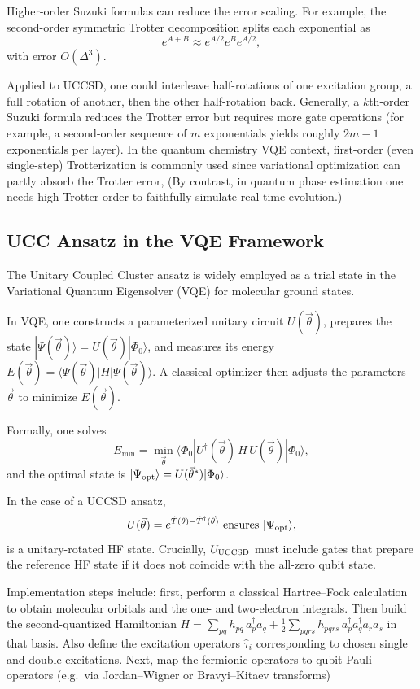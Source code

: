 \documentclass[twocolumn,superscriptaddress,unsortedaddress,nofootinbib,amsmath,amssymb,
aps,floatfix]{revtex4-2}
\begin{document}
Higher-order Suzuki formulas can reduce the error scaling.  For
example, the second-order symmetric Trotter decomposition splits each
exponential as
\begin{equation}
e^{A+B} \approx e^{A/2} e^{B} e^{A/2},
\end{equation}
with error $O(\Delta^3)$.

Applied to UCCSD, one could interleave half-rotations of one
excitation group, a full rotation of another, then the other
half-rotation back.  Generally, a $k$th-order Suzuki formula reduces
the Trotter error but requires more gate operations (for example, a
second-order sequence of $m$ exponentials yields roughly $2m-1$
exponentials per layer).  In the quantum chemistry VQE context,
first-order (even single-step) Trotterization is commonly used since
variational optimization can partly absorb the Trotter error,
(By contrast, in quantum phase estimation one needs high Trotter order to faithfully simulate real time-evolution.) 

\subsection{UCC Ansatz in the VQE Framework}

The Unitary Coupled Cluster ansatz is widely employed as a trial state
in the Variational Quantum Eigensolver (VQE) for molecular ground
states.

In VQE, one constructs a parameterized unitary circuit
$U(\vec\theta)$, prepares the state $|\Psi(\vec\theta)\rangle =
U(\vec\theta)|\Phi_0\rangle$, and measures its energy
$E(\vec\theta)=\langle\Psi(\vec\theta)|H|\Psi(\vec\theta)\rangle$.  A
classical optimizer then adjusts the parameters $\vec\theta$ to
minimize $E(\vec\theta)$.

Formally, one solves 
\[
E_{\min} = \min_{\vec\theta}\langle\Phi_0|U^\dagger(\vec\theta)\,H\,U(\vec\theta)|\Phi_0\rangle,
\]
and the optimal state is $|\Psi_{\rm opt}\rangle = U(\vec\theta^*)|\Phi_0\rangle$.

In the case of a UCCSD ansatz,
\[
U(\vec\theta)=e^{\hat T(\vec\theta)-\hat T^\dagger(\vec\theta)}$ ensures $|\Psi_{\rm opt}\rangle,
\]
is a unitary-rotated HF state.  Crucially, $U_{\rm UCCSD}$ must
include gates that prepare the reference HF state if it does not
coincide with the all-zero qubit state.

Implementation steps include: first, perform a classical Hartree--Fock
calculation to obtain molecular orbitals and the one- and two-electron
integrals.  Then build the second-quantized Hamiltonian
$H=\sum_{pq}h_{pq}\,a_p^\dagger a_q +
\frac12\sum_{pqrs}h_{pqrs}\,a_p^\dagger a_q^\dagger a_r a_s$ in that
basis.  Also define the excitation operators $\hat\tau_i$
corresponding to chosen single and double excitations.  Next, map the
fermionic operators to qubit Pauli operators (e.g.\ via Jordan–Wigner
or Bravyi–Kitaev transforms)
\end{document}
